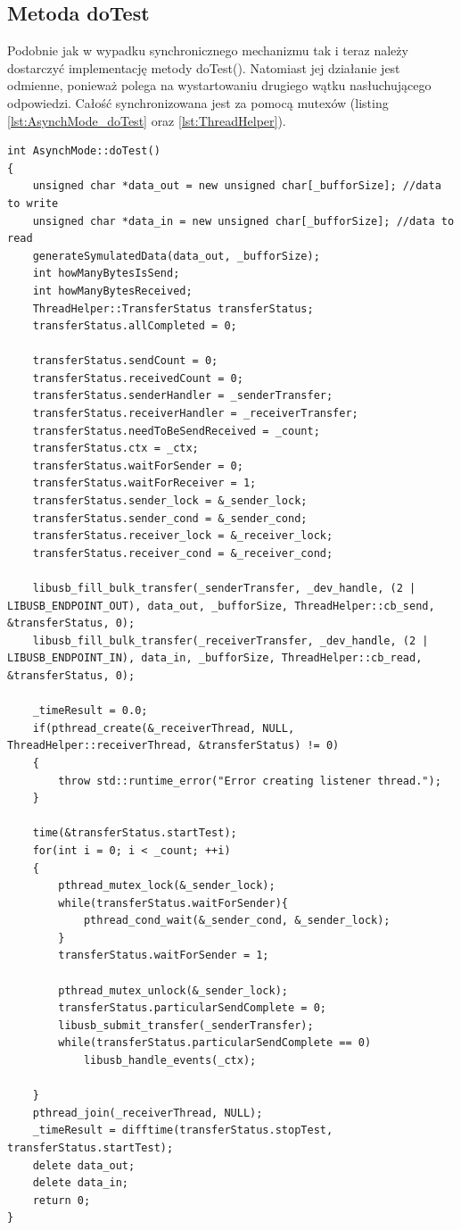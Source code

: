 \documentclass{BscUS}
\begin{document}
\subsection{Metoda doTest}
Podobnie jak w wypadku synchronicznego mechanizmu tak i teraz należy dostarczyć implementację metody doTest(). Natomiast jej działanie jest odmienne, ponieważ polega na wystartowaniu drugiego wątku nasłuchującego odpowiedzi. Całość synchronizowana jest za pomocą mutexów (listing \ref{lst:AsynchMode_doTest} oraz \ref{lst:ThreadHelper}).
\begin{lstlisting}[caption={Metoda AsynchMode::doTest()},label={lst:AsynchMode_doTest}]
int AsynchMode::doTest()
{
	unsigned char *data_out = new unsigned char[_bufforSize]; //data to write
	unsigned char *data_in = new unsigned char[_bufforSize]; //data to read
	generateSymulatedData(data_out, _bufforSize);
	int howManyBytesIsSend; 
	int howManyBytesReceived;
	ThreadHelper::TransferStatus transferStatus;
	transferStatus.allCompleted = 0;
	
	transferStatus.sendCount = 0;
	transferStatus.receivedCount = 0;
	transferStatus.senderHandler = _senderTransfer;
	transferStatus.receiverHandler = _receiverTransfer;
	transferStatus.needToBeSendReceived = _count;
	transferStatus.ctx = _ctx;
	transferStatus.waitForSender = 0;
	transferStatus.waitForReceiver = 1;
	transferStatus.sender_lock = &_sender_lock;
	transferStatus.sender_cond = &_sender_cond;
	transferStatus.receiver_lock = &_receiver_lock;
	transferStatus.receiver_cond = &_receiver_cond;
	
	libusb_fill_bulk_transfer(_senderTransfer, _dev_handle, (2 | LIBUSB_ENDPOINT_OUT), data_out, _bufforSize, ThreadHelper::cb_send, &transferStatus, 0);
	libusb_fill_bulk_transfer(_receiverTransfer, _dev_handle, (2 | LIBUSB_ENDPOINT_IN), data_in, _bufforSize, ThreadHelper::cb_read, &transferStatus, 0);

	_timeResult = 0.0;
	if(pthread_create(&_receiverThread, NULL, ThreadHelper::receiverThread, &transferStatus) != 0)
	{
		throw std::runtime_error("Error creating listener thread.");
	}
	
	time(&transferStatus.startTest); 
	for(int i = 0; i < _count; ++i)
	{
		pthread_mutex_lock(&_sender_lock);
		while(transferStatus.waitForSender){
			pthread_cond_wait(&_sender_cond, &_sender_lock);
		}
		transferStatus.waitForSender = 1;

		pthread_mutex_unlock(&_sender_lock);
		transferStatus.particularSendComplete = 0;
		libusb_submit_transfer(_senderTransfer);
		while(transferStatus.particularSendComplete == 0)
			libusb_handle_events(_ctx);
		
	}
	pthread_join(_receiverThread, NULL);
	_timeResult = difftime(transferStatus.stopTest, transferStatus.startTest);
	delete data_out;
	delete data_in;
	return 0;
}

\end{lstlisting}
\end{document}
